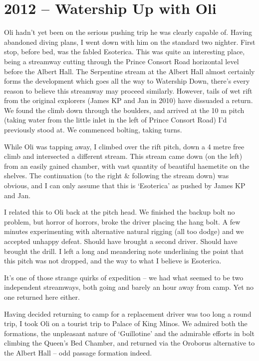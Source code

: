 
\section{2012 -- Watership Up with Oli}\label{watership-up-with-oli}

Oli hadn't yet been on the serious pushing trip he was clearly capable
of. Having abandoned diving plans, I went down with him on the standard
two nighter. First stop, before bed, was the fabled Esoterica. This was
quite an interesting place, being a streamway cutting through the Prince
Consort Road horizontal level before the Albert Hall. The Serpentine
stream at the Albert Hall almost certainly forms the development which
goes all the way to Watership Down, there's every reason to believe this
streamway may proceed similarly. However, tails of wet rift from the
original explorers (James KP and Jan in 2010) have dissuaded a return.
We found the climb down through the boulders, and arrived at the 10 m
pitch (taking water from the little inlet in the left of Prince Consort
Road) I'd previously stood at. We commenced bolting, taking turns.

While Oli was tapping away, I climbed over the rift pitch, down a 4
metre free climb and intersected a different stream. This stream came
down (on the left) from an easily gained chamber, with vast quantity of
beautiful haemetite on the shelves. The continuation (to the right \&
following the stream down) was obvious, and I can only assume that this
is `Esoterica' as pushed by James KP and Jan.

I related this to Oli back at the pitch head. We finished the backup
bolt no problem, but horror of horrors, broke the driver placing the
hang bolt. A few minutes experimenting with alternative natural rigging
(all too dodge) and we accepted unhappy defeat. Should have brought a
second driver. Should have brought the drill. I left a long and
meandering note underlining the point that this pitch was not dropped,
and the way to what I believe is Esoterica.

It's one of those strange quirks of expedition -- we had what seemed to
be two independent streamways, both going and barely an hour away from
camp. Yet no one returned here either.

Having decided returning to camp for a replacement driver was too long a
round trip, I took Oli on a tourist trip to Palace of King Minos. We
admired both the formations, the unpleasant nature of `Guillotine' and
the admirable efforts in bolt climbing the Queen's Bed Chamber, and
returned via the Oroborus alternative to the Albert Hall -- odd passage
formation indeed.

